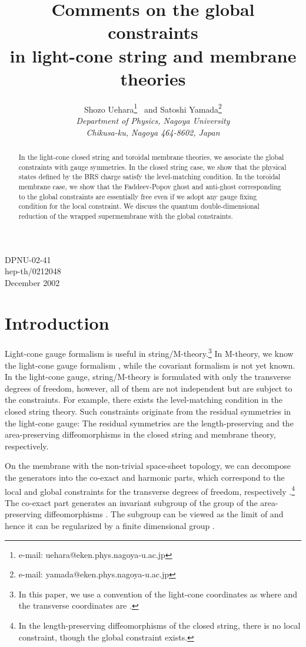 \documentclass[12pt,a4paper]{article}
\title{Comments on the global constraints\\
in light-cone string and membrane theories}
\author{{\sc Shozo Uehara}\footnote{e-mail:
uehara@eken.phys.nagoya-u.ac.jp}~ and
{\sc Satoshi Yamada}\footnote{e-mail:
yamada@eken.phys.nagoya-u.ac.jp}\vspace{4mm}\\
{\sl Department of Physics, Nagoya University}\\
{\sl Chikusa-ku, Nagoya 464-8602, Japan}}
\date{}
\begin{document}
\maketitle
\vspace{-80mm}
\begin{flushright}
DPNU-02-41\\
hep-th/0212048\\
December 2002
\end{flushright}
\vspace{57mm}


\begin{abstract}
In the light-cone closed string and toroidal membrane theories,
we associate the global constraints with gauge symmetries.
In the closed string case, we show that the physical states defined by
the BRS charge satisfy the level-matching condition.
In the toroidal membrane case, we show that the Faddeev-Popov ghost and
anti-ghost corresponding to the global constraints are essentially
free even if we adopt any gauge fixing condition for the local
constraint. We discuss the quantum double-dimensional reduction of the
wrapped supermembrane with the global constraints.
\end{abstract}

\section{Introduction}
Light-cone gauge formalism is useful in string/M-theory.\footnote{In
this paper, we use a convention of the light-cone coordinates as
\coordHE{} where \coordHE{}
and the transverse coordinates are \coordHE{}  \coordHE{}. }
In M-theory, we know the light-cone gauge formalism \cite{BFSS},
while the covariant formalism is not yet known.
In the light-cone gauge, string/M-theory is formulated with only
the transverse degrees of freedom, however, all of them are not
independent but are subject to the constraints. For example, there
exists the level-matching condition in the closed string theory.
Such constraints originate from the residual symmetries in the
light-cone gauge: The residual symmetries are the length-preserving
and the area-preserving diffeomorphisms in the closed string and
membrane theory, respectively.

On the membrane with the non-trivial space-sheet topology, we can
decompose the generators into the co-exact and harmonic parts, which
correspond to the local and global constraints for the transverse
degrees of freedom, respectively \cite{FI,BPS,dWMN}.\footnote{In the
length-preserving diffeomorphisms of the closed string, there is no
local constraint, though the global constraint exists.}
The co-exact part generates an invariant subgroup of the group of
the area-preserving diffeomorphisms \cite{dWMN}.
The subgroup can be viewed as the \coordHE{} limit
of \coordHE{} and hence it can be regularized by a finite dimensional
group \coordHE{} \cite{Hop,dWHN}.
\end{document}
